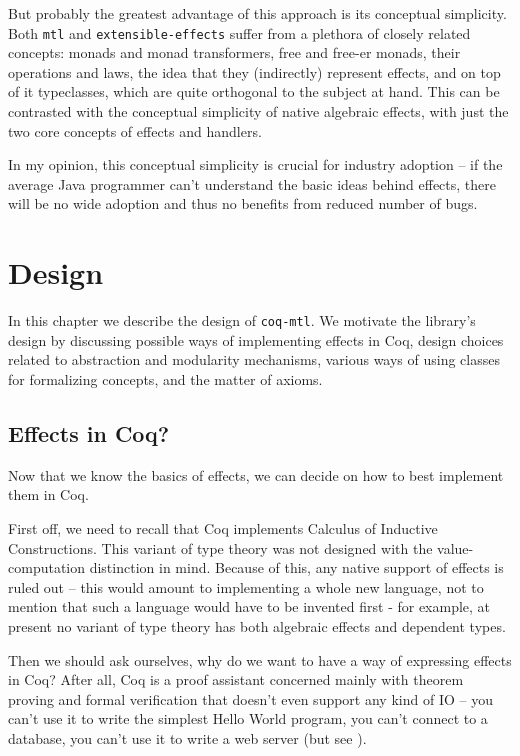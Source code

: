 \documentclass[declaration,inz,english,shortabstract]{iithesis}
\newcommand{\libname}{\m{coq-mtl}}
\newcommand{\m}[1]{\texttt{#1}}
\begin{document}
But probably the greatest advantage of this approach is its conceptual simplicity. Both \m{mtl} and \m{extensible-effects} suffer from a plethora of closely related concepts: monads and monad transformers, free and free-er monads, their operations and laws, the idea that they (indirectly) represent effects, and on top of it typeclasses, which are quite orthogonal to the subject at hand. This can be contrasted with the conceptual simplicity of native algebraic effects, with just the two core concepts of effects and handlers.

In my opinion, this conceptual simplicity is crucial for industry adoption -- if the average Java programmer can't understand the basic ideas behind effects, there will be no wide adoption and thus no benefits from reduced number of bugs.

\chapter{Design} \label{ch3}

In this chapter we describe the design of \libname. We motivate the library's design by discussing possible ways of implementing effects in Coq, design choices related to abstraction and modularity mechanisms, various ways of using classes for formalizing concepts, and the matter of axioms.

\section{Effects in Coq?}

Now that we know the basics of effects, we can decide on how to best implement them in Coq.

First off, we need to recall that Coq implements Calculus of Inductive Constructions. This variant of type theory was not designed with the value-computation distinction in mind. Because of this, any native support of effects is ruled out -- this would amount to implementing a whole new language, not to mention that such a language would have to be invented first - for example, at present no variant of type theory has both algebraic effects and dependent types.

Then we should ask ourselves, why do we want to have a way of expressing effects in Coq? After all, Coq is a proof assistant concerned mainly with theorem proving and formal verification that doesn't even support any kind of IO -- you can't use it to write the simplest Hello World program, you can't connect to a database, you can't use it to write a web server (but see \cite{CoqIO}).
\end{document}

